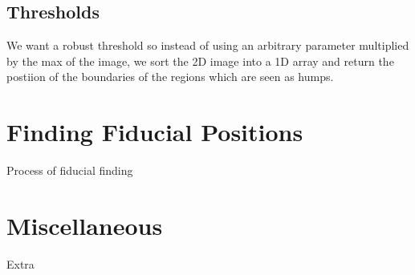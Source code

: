 \documentclass[10pt]{article}
\begin{document}
\subsection{Thresholds} %
\label{sub:thresholds}
We want a robust threshold so instead of using an arbitrary parameter multiplied by the max of the image, we sort the 2D image into a 1D array and return the postiion of the boundaries of the regions which are seen as humps.

\section{Finding Fiducial Positions} %
\label{sec:finding_fiducial_positions}
Process of fiducial finding

\section{Miscellaneous} %
\label{sec:miscellaneous}
Extra
\end{document}
